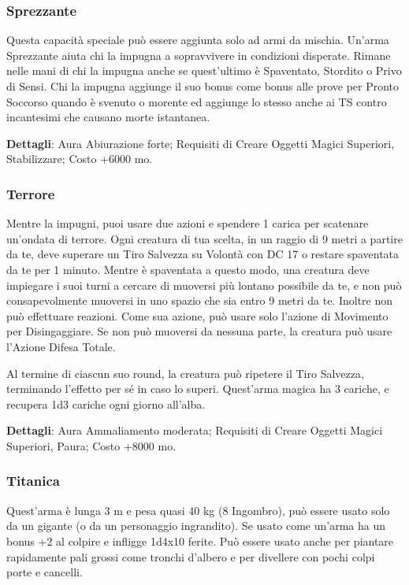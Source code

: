 \begin{multicols}{2}
\subsubsection*{Sprezzante}

Questa capacità speciale può essere aggiunta solo ad armi da mischia. Un'arma Sprezzante aiuta chi la impugna a sopravvivere in condizioni disperate. Rimane nelle mani di chi la impugna anche se quest'ultimo è Spaventato, Stordito o Privo di Sensi. Chi la impugna aggiunge il suo bonus come bonus alle prove per Pronto Soccorso quando è svenuto o morente ed aggiunge lo stesso anche ai TS contro incantesimi che causano morte istantanea.

\textbf{Dettagli}: Aura Abiurazione forte; Requisiti di Creare Oggetti Magici Superiori, Stabilizzare; Costo +6000 mo.

\subsubsection*{Terrore}

Mentre la impugni, puoi usare due azioni e spendere 1 carica per scatenare un'ondata di terrore.
Ogni creatura di tua scelta, in un raggio di 9 metri a partire da te, deve superare un Tiro Salvezza su Volontà con DC 17 o restare spaventata da te per 1 minuto. Mentre è spaventata a questo modo, una creatura deve impiegare i suoi turni a cercare di muoversi più lontano possibile da te, e non può consapevolmente muoversi in uno spazio che sia entro 9 metri da te. Inoltre non può effettuare reazioni. Come sua azione, può usare solo l'azione di Movimento per Disingaggiare. Se non può muoversi da nessuna parte, la creatura può usare l'Azione Difesa Totale.

Al termine di ciascun suo round, la creatura può ripetere il Tiro Salvezza, terminando l'effetto per sé in caso lo superi. Quest'arma magica ha 3 cariche, e recupera 1d3 cariche ogni giorno all'alba.

\textbf{Dettagli}: Aura Ammaliamento moderata; Requisiti di Creare Oggetti Magici Superiori, Paura; Costo +8000 mo.

\subsubsection*{Titanica}

Quest'arma è lunga 3 m e pesa quasi 40 kg (8 Ingombro), può essere usato solo da un gigante (o da un personaggio ingrandito). Se usato come un’arma ha un bonus +2 al colpire e infligge 1d4x10 ferite. Può essere usato anche per piantare rapidamente pali grossi come tronchi d'albero e per divellere con pochi colpi porte e cancelli.


\end{multicols}
